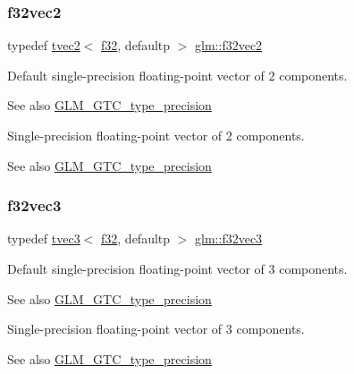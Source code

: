 \subsubsection{\texorpdfstring{f32vec2}{f32vec2}}
{\footnotesize\ttfamily typedef \hyperlink{structglm_1_1tvec2}{tvec2}$<$ \hyperlink{group__gtc__type__precision_ga0ec999b57f5330d9021256e96038df04}{f32}, defaultp $>$ \hyperlink{group__gtc__type__precision_ga8681dee3524dea86388178c49c27079a}{glm\+::f32vec2}}

Default single-\/precision floating-\/point vector of 2 components. \begin{DoxySeeAlso}{See also}
\hyperlink{group__gtc__type__precision}{G\+L\+M\+\_\+\+G\+T\+C\+\_\+type\+\_\+precision}
\end{DoxySeeAlso}
Single-\/precision floating-\/point vector of 2 components. \begin{DoxySeeAlso}{See also}
\hyperlink{group__gtc__type__precision}{G\+L\+M\+\_\+\+G\+T\+C\+\_\+type\+\_\+precision} 
\end{DoxySeeAlso}
\mbox{\label{group__gtc__type__precision_gab550330e62a7bc3fa9e6740b9421037c}} 
\subsubsection{\texorpdfstring{f32vec3}{f32vec3}}
{\footnotesize\ttfamily typedef \hyperlink{structglm_1_1tvec3}{tvec3}$<$ \hyperlink{group__gtc__type__precision_ga0ec999b57f5330d9021256e96038df04}{f32}, defaultp $>$ \hyperlink{group__gtc__type__precision_gab550330e62a7bc3fa9e6740b9421037c}{glm\+::f32vec3}}

Default single-\/precision floating-\/point vector of 3 components. \begin{DoxySeeAlso}{See also}
\hyperlink{group__gtc__type__precision}{G\+L\+M\+\_\+\+G\+T\+C\+\_\+type\+\_\+precision}
\end{DoxySeeAlso}
Single-\/precision floating-\/point vector of 3 components. \begin{DoxySeeAlso}{See also}
\hyperlink{group__gtc__type__precision}{G\+L\+M\+\_\+\+G\+T\+C\+\_\+type\+\_\+precision} 
\end{DoxySeeAlso}
\mbox{\label{group__gtc__type__precision_ga6848e3b5cb5c1f4c117717b309e726eb}} 
